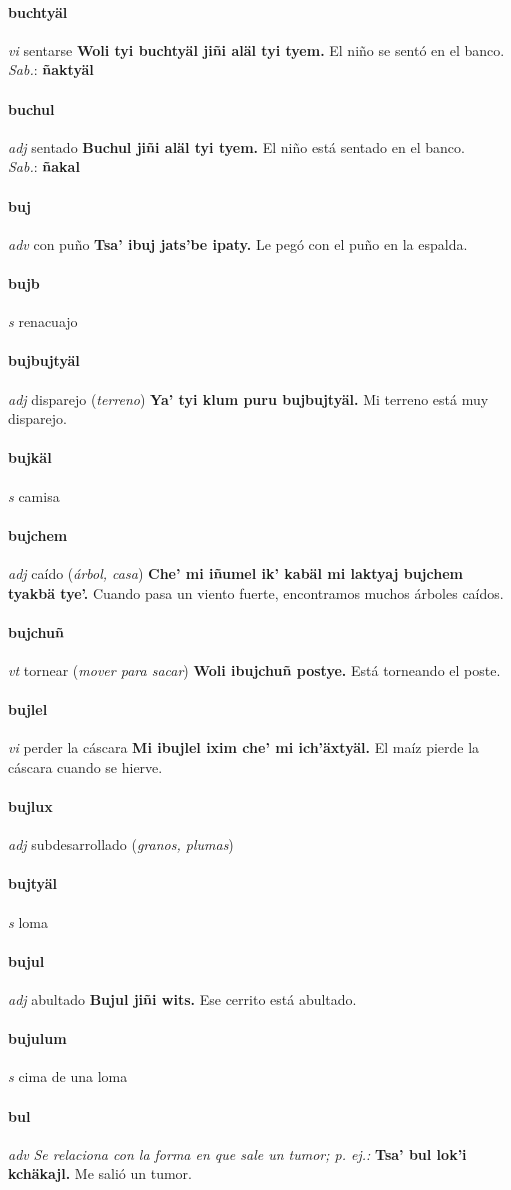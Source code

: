 \documentclass{scrbook}
\newcommand{\entry}[1]{\paragraph{#1}}
\newcommand{\nontranslationdef}[1]{\textit{#1}}
\newcommand{\partofspeech}[1]{\textit{#1}}
\newcommand{\spanishtranslation}[1]{#1}
\newcommand{\clarification}[1]{(\textit{#1})}
\newcommand{\cholexample}[1]{\textbf{#1}}
\newcommand{\exampletranslation}[1]{#1}
\newcommand{\dialectvariant}[1]{\\\textit{#1}:}
\newcommand{\dialectword}[1]{\textbf{#1}}
\begin{document}
\begin{multicols}{2}
\entry{buchtyäl}
\partofspeech{vi}
\spanishtranslation{sentarse}
\cholexample{Woli tyi buchtyäl jiñi aläl tyi tyem.}
\exampletranslation{El niño se sentó en el banco.}
\dialectvariant{Sab.}
\dialectword{ñaktyäl}

\entry{buchul}
\partofspeech{adj}
\spanishtranslation{sentado}
\cholexample{Buchul jiñi aläl tyi tyem.}
\exampletranslation{El niño está sentado en el banco.}
\dialectvariant{Sab.}
\dialectword{ñakal}

\entry{buj}
\partofspeech{adv}
\spanishtranslation{con puño}
\cholexample{Tsa' ibuj jats'be ipaty.}
\exampletranslation{Le pegó con el puño en la espalda.}

\entry{bujb}
\partofspeech{s}
\spanishtranslation{renacuajo}

\entry{bujbujtyäl}
\partofspeech{adj}
\spanishtranslation{disparejo}
\clarification{terreno}
\cholexample{Ya' tyi klum puru bujbujtyäl.}
\exampletranslation{Mi terreno está muy disparejo.}

\entry{bujkäl}
\partofspeech{s}
\spanishtranslation{camisa}

\entry{bujchem}
\partofspeech{adj}
\spanishtranslation{caído}
\clarification{árbol, casa}
\cholexample{Che' mi iñumel ik' kabäl mi laktyaj bujchem tyakbä tye'.}
\exampletranslation{Cuando pasa un viento fuerte, encontramos muchos árboles caídos.}

\entry{bujchuñ}
\partofspeech{vt}
\spanishtranslation{tornear}
\clarification{mover para sacar}
\cholexample{Woli ibujchuñ postye.}
\exampletranslation{Está torneando el poste.}

\entry{bujlel}
\partofspeech{vi}
\spanishtranslation{perder la cáscara}
\cholexample{Mi ibujlel ixim che' mi ich'äxtyäl.}
\exampletranslation{El maíz pierde la cáscara cuando se hierve.}

\entry{bujlux}
\partofspeech{adj}
\spanishtranslation{subdesarrollado}
\clarification{granos, plumas}

\entry{bujtyäl}
\partofspeech{s}
\spanishtranslation{loma}

\entry{bujul}
\partofspeech{adj}
\spanishtranslation{abultado}
\cholexample{Bujul jiñi wits.}
\exampletranslation{Ese cerrito está abultado.}

\entry{bujulum}
\partofspeech{s}
\spanishtranslation{cima de una loma}

\entry{bul}
\partofspeech{adv}
\nontranslationdef{Se relaciona con la forma en que sale un tumor; p. ej.:}
\cholexample{Tsa' bul lok'i kchäkajl.}
\exampletranslation{Me salió un tumor.}


\end{multicols}
\end{document}

